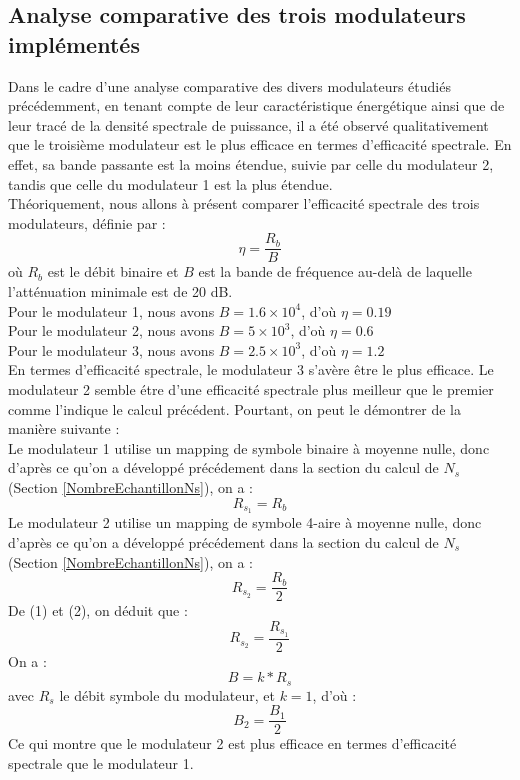 \documentclass[11pt]{article}
\begin{document}
    \subsection{Analyse comparative des trois modulateurs implémentés}
 Dans le cadre d'une analyse comparative des divers modulateurs étudiés précédemment, en tenant compte de leur caractéristique énergétique ainsi que de leur tracé de la densité spectrale de puissance, il a été observé qualitativement que le troisième modulateur est le plus efficace en termes d'efficacité spectrale. En effet, sa bande passante est la moins étendue, suivie par celle du modulateur 2, tandis que celle du modulateur 1 est la plus étendue.\\
 
 Théoriquement, nous allons à présent comparer l'efficacité spectrale des trois modulateurs, définie par :
 $$\eta = \frac{R_b}{B}$$
 où $R_b$ est le débit binaire et $B$ est la bande de fréquence au-delà de laquelle l'atténuation minimale est de 20 dB. \\
 
Pour le modulateur 1, nous avons $B = 1.6 \times 10^4 $, d'où $\eta = 0.19$ \\
 Pour le modulateur 2, nous avons $B = 5 \times 10^3 $, d'où $\eta = 0.6$ \\
 Pour le modulateur 3, nous avons $B = 2.5 \times 10^3 $, d'où $\eta = 1.2$ \\
 
 En termes d'efficacité spectrale, le modulateur 3 s'avère être le plus efficace. Le modulateur 2 semble étre d'une efficacité spectrale plus meilleur que le premier comme l'indique le calcul précédent. Pourtant, on peut le démontrer de la manière suivante : \\
 Le modulateur 1 utilise un mapping de symbole binaire à moyenne nulle, donc d'après ce qu'on a développé précédement dans la section du calcul de $N_s$ (Section \ref{NombreEchantillonNs}), on a :
 \begin{equation}
      R_s_1 = R_b
 \end{equation}
 Le modulateur 2 utilise un mapping de symbole 4-aire à moyenne nulle, donc d'après ce qu'on a développé précédement dans la section du calcul de $N_s$ (Section \ref{NombreEchantillonNs}), on a :
 \begin{equation}
      R_s_2 = \frac{R_b}{2}
 \end{equation}
 De (1) et (2), on déduit que :
 $$ R_s_2 = \frac{R_s_1}{2}$$
 On a :
 $$B = k*R_s$$
 avec $R_s$ le débit symbole du modulateur, et $k=1$, d'où :
 $$ B_2 = \frac{B_1}{2}$$
 Ce qui montre que le modulateur 2 est plus efficace en termes d'efficacité spectrale que le modulateur 1.
 
\end{document}

